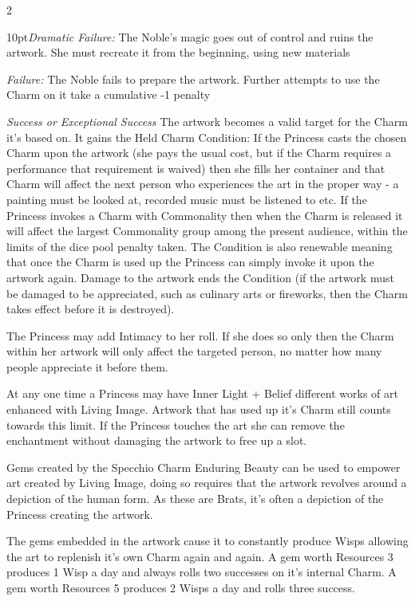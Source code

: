 \begin{multicols}{2}
\begin{myindentpar}{10pt}\emph{Dramatic Failure:} The Noble’s magic goes out of control and ruins the artwork. She must recreate it from the beginning, using new materials
 
 \emph{Failure:} The Noble fails to prepare the artwork. Further attempts to use the Charm on it take a cumulative -1 penalty
 
 \emph{Success or Exceptional Success} The artwork becomes a valid target for the Charm it’s based on. It gains the Held Charm Condition: If the Princess casts the chosen Charm upon the artwork (she pays the usual cost, but if the Charm requires a performance that requirement is waived) then she fills her container and that Charm will affect the next person who experiences the art in the proper way - a painting must be looked at, recorded music must be listened to etc. If the Princess invokes a Charm with Commonality then when the Charm is released it will affect the largest Commonality group among the present audience, within the limits of the dice pool penalty taken. The Condition is also renewable meaning that once the Charm is used up the Princess can simply invoke it upon the artwork again. Damage to the artwork ends the Condition (if the artwork must be damaged to be appreciated, such as culinary arts or fireworks, then the Charm takes effect 
before it is destroyed). 
 
\end{myindentpar}

The Princess may add Intimacy to her roll. If she does so only then the Charm within her artwork will only affect the targeted person, no matter how many people appreciate it before them. 

At any one time a Princess may have Inner Light + Belief different works of art enhanced with Living Image. Artwork that has used up it's Charm still counts towards this limit. If the Princess touches the art she can remove the enchantment without damaging the artwork to free up a slot. 

Gems created by the Specchio Charm Enduring Beauty can be used to empower art created by Living Image, doing so requires that the artwork revolves around a depiction of the human form. As these are Brats, it's often a depiction of the Princess creating the artwork. 

The gems embedded in the artwork cause it to constantly produce Wisps allowing the art to replenish it's own Charm again and again. A gem worth Resources 3 produces 1 Wisp a day and always rolls two successes on it's internal Charm. A gem worth Resources 5 produces 2 Wisps a day and rolls three success. 


\end{multicols}
